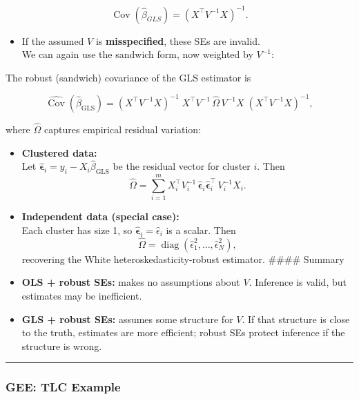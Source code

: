 \documentclass[
  letterpaper,
  DIV=11,
  numbers=noendperiod]{scrreprt}
\providecommand{\tightlist}{%
  \setlength{\itemsep}{0pt}\setlength{\parskip}{0pt}}\usepackage{longtable,booktabs,array}
\begin{document}
\[
  \operatorname{Cov}(\hat\beta_{GLS}) = (X^\top V^{-1} X)^{-1}.
\]

\begin{itemize}
\tightlist
\item
  If the assumed \(V\) is \textbf{misspecified}, these SEs are
  invalid.\\
  We can again use the sandwich form, now weighted by \(V^{-1}\):
\end{itemize}

The robust (sandwich) covariance of the GLS estimator is

\[
\widehat{\operatorname{Cov}}(\hat\beta_{\text{GLS}})
= (X^\top V^{-1} X)^{-1} \;
X^\top V^{-1}\,\hat\Omega\,V^{-1} X \;
(X^\top V^{-1} X)^{-1},
\]

where \(\hat\Omega\) captures empirical residual variation:

\begin{itemize}
\item
  \textbf{Clustered data:}\\
  Let \(\hat{\boldsymbol\epsilon}_i = y_i - X_i \hat\beta_{\text{GLS}}\)
  be the residual vector for cluster \(i\). Then\\
  \[
  \hat\Omega = \sum_{i=1}^m X_i^\top V_i^{-1}\,\hat{\boldsymbol\epsilon}_i \hat{\boldsymbol\epsilon}_i^\top\, V_i^{-1} X_i.
  \]
\item
  \textbf{Independent data (special case):}\\
  Each cluster has size 1, so
  \(\hat{\boldsymbol\epsilon}_i = \hat\epsilon_i\) is a scalar. Then\\
  \[
  \hat\Omega = \operatorname{diag}(\hat\epsilon_1^2, \ldots, \hat\epsilon_N^2),
  \] recovering the White heteroskedasticity-robust estimator. \#\#\#\#
  Summary
\item
  \textbf{OLS + robust SEs:} makes no assumptions about \(V\). Inference
  is valid, but estimates may be inefficient.\\
\item
  \textbf{GLS + robust SEs:} assumes some structure for \(V\). If that
  structure is close to the truth, estimates are more efficient; robust
  SEs protect inference if the structure is wrong.
\end{itemize}

\begin{center}\rule{0.5\linewidth}{0.5pt}\end{center}

\hypertarget{gee-tlc-example}{%
\subsubsection*{GEE: TLC Example}\label{gee-tlc-example}}
\end{document}
